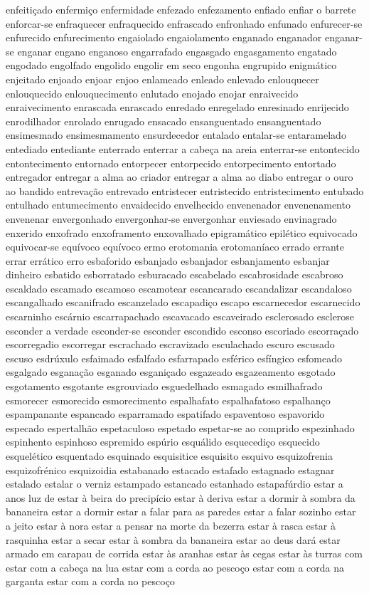 \begin{appendices}
enfeiti\c{c}ado enfermi\c{c}o enfermidade enfezado enfezamento enfiado enfiar o barrete enforcar-se enfraquecer enfraquecido enfrascado enfronhado enfunado enfurecer-se enfurecido enfurecimento engaiolado engaiolamento enganado enganador enganar-se enganar engano enganoso engarrafado engasgado engasgamento engatado engodado engolfado engolido engolir em seco engonha engrupido enigm\'{a}tico enjeitado enjoado enjoar enjoo enlameado enleado enlevado enlouquecer enlouquecido enlouquecimento enlutado enojado enojar enraivecido enraivecimento enrascada enrascado enredado enregelado enresinado enrijecido enrodilhador enrolado enrugado ensacado ensanguentado ensanguentado ensimesmado ensimesmamento ensurdecedor entalado entalar-se entaramelado entediado entediante enterrado enterrar a cabe\c{c}a na areia enterrar-se entontecido entontecimento entornado entorpecer entorpecido entorpecimento entortado entregador entregar a alma ao criador entregar a alma ao diabo entregar o ouro ao bandido entreva\c{c}\~ao entrevado entristecer entristecido entristecimento entubado entulhado entumecimento envaidecido envelhecido envenenador envenenamento envenenar envergonhado envergonhar-se envergonhar enviesado envinagrado enxerido enxofrado enxoframento enxovalhado epigram\'{a}tico epil\'{e}tico equivocado equivocar-se equ\'{i}voco equ\'{i}voco ermo erotomania erotoman\'{i}aco errado errante errar err\'{a}tico erro esbaforido esbanjado esbanjador esbanjamento esbanjar dinheiro esbatido esborratado esburacado escabelado escabrosidade escabroso escaldado escamado escamoso escamotear escancarado escandalizar escandaloso escangalhado escanifrado escanzelado escapadi\c{c}o escapo escarnecedor escarnecido escarninho esc\'{a}rnio escarrapachado escavacado escaveirado esclerosado esclerose esconder a verdade esconder-se esconder escondido esconso escoriado escorra\c{c}ado escorregadio escorregar escrachado escravizado esculachado escuro escusado escuso esdr\'{u}xulo esfaimado esfalfado esfarrapado esf\'{e}rico esf\'{i}ngico esfomeado esgalgado esgana\c{c}\~ao esganado esgani\c{c}ado esgazeado esgazeamento esgotado esgotamento esgotante esgrouviado esguedelhado esmagado esmilhafrado esmorecer esmorecido esmorecimento espalhafato espalhafatoso espalhan\c{c}o espampanante espancado esparramado espatifado espaventoso espavorido especado espertalh\~ao espetaculoso espetado espetar-se ao comprido espezinhado espinhento espinhoso espremido esp\'{u}rio esqu\'{a}lido esquecedi\c{c}o esquecido esquel\'{e}tico esquentado esquinado esquisitice esquisito esquivo esquizofrenia esquizofr\'{e}nico esquizoidia estabanado estacado estafado estagnado estagnar estalado estalar o verniz estampado estancado estanhado estapaf\'{u}rdio estar a anos luz de estar \`{a} beira do precip\'{i}cio estar \`{a} deriva estar a dormir \`{a} sombra da bananeira estar a dormir estar a falar para as paredes estar a falar sozinho estar a jeito estar \`{a} nora estar a pensar na morte da bezerra estar \`{a} rasca estar \`{a} rasquinha estar a secar estar \`{a} sombra da bananeira estar ao deus dar\'{a} estar armado em carapau de corrida estar \`{a}s aranhas estar \`{a}s cegas estar \`{a}s turras com estar com a cabe\c{c}a na lua estar com a corda ao pesco\c{c}o estar com a corda na garganta estar com a corda no pesco\c{c}o 
\end{appendices}

